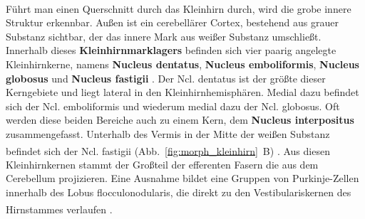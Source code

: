 \\ \noindent Führt man einen Querschnitt durch das Kleinhirn durch, wird die grobe innere Struktur erkennbar. Außen ist ein cerebellärer Cortex, bestehend aus grauer Substanz sichtbar, der das innere Mark aus weißer Substanz umschließt. Innerhalb dieses \textbf{Kleinhirnmarklagers} befinden sich vier paarig angelegte Kleinhirnkerne, namens \textbf{Nucleus dentatus}, \textbf{Nucleus emboliformis}, \textbf{Nucleus globosus} und \textbf{Nucleus fastigii} . Der Ncl. dentatus ist der größte dieser Kerngebiete und liegt lateral in den Kleinhirnhemisphären. Medial dazu befindet sich der Ncl. emboliformis und wiederum medial dazu der Ncl. globosus. Oft werden diese beiden Bereiche auch zu einem Kern, dem \textbf{Nucleus interpositus} zusammengefasst. Unterhalb des Vermis in der Mitte der weißen Substanz befindet sich der Ncl. fastigii (Abb.~\ref{fig:morph_kleinhirn}~B) \textsuperscript{\cite[Kap.~7]{trepel2011neuroanatomie}}. Aus diesen Kleinhirnkernen stammt der Großteil der efferenten Fasern die aus dem Cerebellum projizieren. Eine Ausnahme bildet eine Gruppen von Purkinje-Zellen innerhalb des Lobus flocculonodularis, die direkt zu den Vestibulariskernen des Hirnstammes verlaufen \textsuperscript{\cite[Kap.~42]{kandel2013principles}}. 

